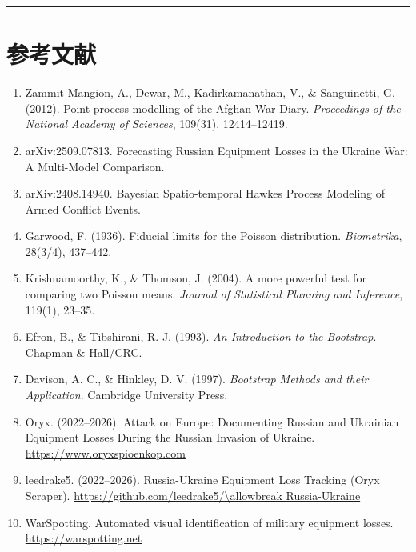 \documentclass[
  a4paper,
  fontset=none,
]{ctexart}
\begin{document}
\begin{center}\rule{0.5\linewidth}{0.5pt}\end{center}

\hypertarget{ux53c2ux8003ux6587ux732e}{%
\section{参考文献}\label{ux53c2ux8003ux6587ux732e}}

\begin{enumerate}
\def\labelenumi{\arabic{enumi}.}
\item
  Zammit-Mangion, A., Dewar, M., Kadirkamanathan, V., \& Sanguinetti, G.
  (2012). Point process modelling of the Afghan War Diary.
  \emph{Proceedings of the National Academy of Sciences}, 109(31),
  12414--12419.
\item
  arXiv:2509.07813. Forecasting Russian Equipment Losses in the Ukraine
  War: A Multi-Model Comparison.
\item
  arXiv:2408.14940. Bayesian Spatio-temporal Hawkes Process Modeling of
  Armed Conflict Events.
\item
  Garwood, F. (1936). Fiducial limits for the Poisson distribution.
  \emph{Biometrika}, 28(3/4), 437--442.
\item
  Krishnamoorthy, K., \& Thomson, J. (2004). A more powerful test for
  comparing two Poisson means. \emph{Journal of Statistical Planning and
  Inference}, 119(1), 23--35.
\item
  Efron, B., \& Tibshirani, R. J. (1993). \emph{An Introduction to the
  Bootstrap}. Chapman \& Hall/CRC.
\item
  Davison, A. C., \& Hinkley, D. V. (1997). \emph{Bootstrap Methods and
  their Application}. Cambridge University Press.
\item
  Oryx. (2022--2026). Attack on Europe: Documenting Russian and
  Ukrainian Equipment Losses During the Russian Invasion of Ukraine.
  \url{https://www.oryxspioenkop.com}
\item
  leedrake5. (2022--2026). Russia-Ukraine Equipment Loss Tracking (Oryx
  Scraper). \url{https://github.com/leedrake5/\allowbreak Russia-Ukraine}
\item
  WarSpotting. Automated visual identification of military equipment
  losses. \url{https://warspotting.net}
\end{enumerate}
\end{document}
